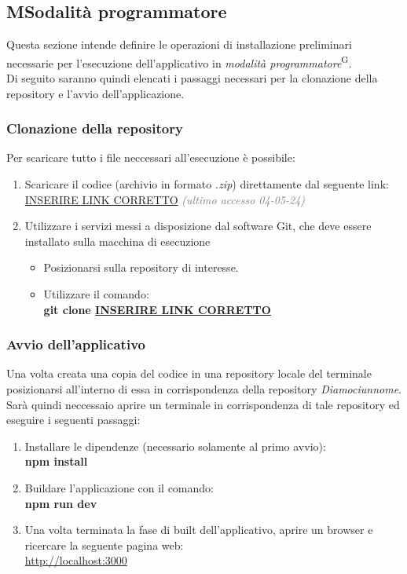     \subsection{MSodalità programmatore}\label{sec:install_run:esperto}
    Questa sezione intende definire le operazioni di installazione preliminari necessarie per l'esecuzione dell'applicativo in \textit{modalità programmatore}\textsuperscript{G}.\\
    Di seguito saranno quindi elencati i passaggi necessari per la clonazione della repository e l'avvio dell'applicazione. \\
    
    \subsubsection{Clonazione della repository}\label{sec:install_run:esperto:clone}
    Per scaricare tutto i file neccessari all'esecuzione è possibile: 
    \begin{enumerate}
        \item Scaricare il codice (archivio in formato \textit{.zip}) direttamente dal seguente link: \\  
        \url{INSERIRE LINK CORRETTO} \textcolor{gray}{\textit{(ultimo accesso 04-05-24)}}
        \item Utilizzare i servizi messi a disposizione dal software Git, che deve essere installato sulla macchina di esecuzione
        \begin{itemize}
            \item Posizionarsi sulla repository di interesse.
            \item Utilizzare il comando:\\
            \textbf{git clone \url{INSERIRE LINK CORRETTO} }
        \end{itemize}
    \end{enumerate}

    \subsubsection{Avvio dell'applicativo}\label{sec:install_run:esperto:avvio}
    Una volta creata una copia del codice in una repository locale del terminale posizionarsi all'interno di essa in corrispondenza della repository \textit{Diamociunnome}.\\
    Sarà quindi neccessaio aprire un terminale in corrispondenza di tale repository ed eseguire i seguenti passaggi: 
    \begin{enumerate}
        \item Installare le dipendenze (necessario solamente al primo avvio): \\  
        \textbf{npm install}
        \item Buildare l'applicazione con il comando: \\  
        \textbf{npm run dev}
        \item Una volta terminata la fase di built dell'applicativo, aprire un browser e ricercare la seguente pagina web: \\  
        \url{http://localhost:3000}
    \end{enumerate}

